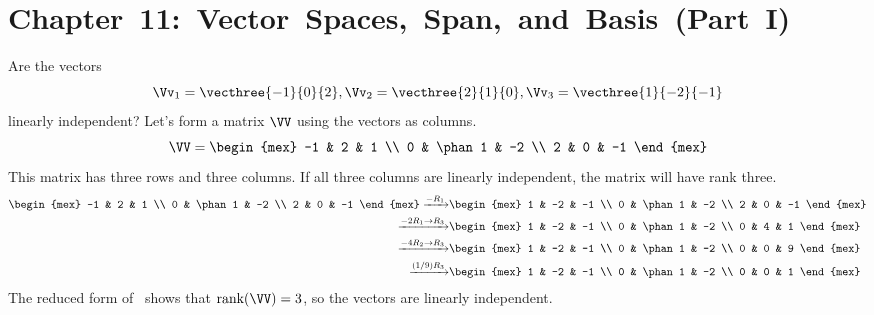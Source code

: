 \documentclass[12pt,ragged]{pajarticle}
\begin{document}

\section*{\hbox{Chapter 11: Vector Spaces, Span, and Basis (Part~I)}}

\begin{question}{1}{%
Are the vectors
\[ \Vv_1 = \vecthree{-1}{0}{2}, \Vv_2 = \vecthree{2}{1}{0}, \Vv_3 = \vecthree{1}{-2}{-1} \]
linearly independent?}{
Let's form a matrix $\VV$ using the vectors as columns.
\[ \VV = \begin{mex} -1 & 2 & 1 \\ 0 & \phan1 & -2 \\ 2 & 0 & -1 \end{mex} \]
This matrix has three rows and three columns. If all three columns are linearly independent, the matrix will have rank three.
\begin{align*}
	\begin{mex} -1 & 2 & 1 \\ 0 & \phan1 & -2 \\ 2 & 0 & -1 \end{mex} \xrightarrow{-R_1}&
	\begin{mex} 1 & -2 & -1 \\ 0 & \phan1 & -2 \\ 2 & 0 & -1 \end{mex} \\
	\xrightarrow{-2R_1\rightarrow R_3}&
	\begin{mex} 1 & -2 & -1 \\ 0 & \phan1 & -2 \\ 0 & 4 & 1 \end{mex} \\
	\xrightarrow{-4R_2\rightarrow R_3}&
	\begin{mex} 1 & -2 & -1 \\ 0 & \phan1 & -2 \\ 0 & 0 & 9 \end{mex} \\
	\xrightarrow{(1/9) R_3}&
	\begin{mex} 1 & -2 & -1 \\ 0 & \phan1 & -2 \\ 0 & 0 & 1 \end{mex}
\end{align*}
The reduced form of \VV\ shows that $\text{rank}(\VV)=3$, so the vectors are linearly independent.
}
\end{question}
\end{document}
